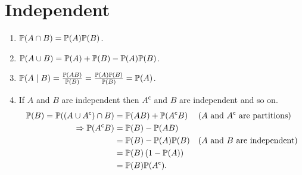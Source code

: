 \section{Independent}
    \begin{enumerate}
        \item $\P{A\cap B}=\P{A}\P{B}$.
        \item $\P{A \cup B} = \P{A}+\P{B}-\P{A}\P{B}$.
        \item $\condP{A}{B} = \frac{\P{AB}}{\P{B}}=\frac{\P{A}\P{B}}{\P{B}}=\P{A}$.
        \item If $A$ and $B$ are independent then $A^{\mathsf{c}}$ and $B$ are independent and so on.{
            \begin{align*}
                \P{B} = \P{(A\cup A^{\mathsf{c}})\cap B}
                &= \P{AB}+\P{A^{\mathsf{c}}B} && \text{($A$ and $A^\mathsf{c}$ are partitions)}\\
                \Rightarrow \P{A^{\mathsf{c}}B}
                &= \P{B}-\P{AB} \\
                &= \P{B}-\P{A}\P{B} && \text{($A$ and $B$ are independent)}\\
                &= \P{B}\left(1-\P{A}\right) \\
                &= \P{B}\P{A^{\mathsf{c}}}.
            \end{align*}
        }
    \end{enumerate}